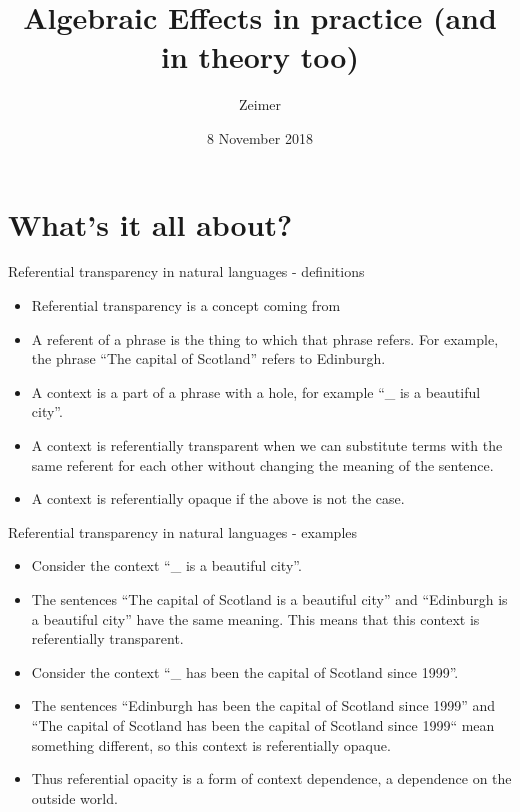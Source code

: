 \documentclass{beamer}
\title{Algebraic Effects in practice (and in theory too)}
\author{Zeimer}
\date{8 November 2018}
\newcommand{\link}[2]{\href{#2}{\color{blue}{#1}}}
\begin{document}
\frame{\titlepage}

\frame{\tableofcontents}

\section{What's it all about?}

\begin{frame}{Referential transparency in natural languages - definitions}
\begin{itemize}
	\item Referential transparency is a concept coming from \link{analytic philosophy}{https://en.wikipedia.org/wiki/Analytic_philosophy}
	\item A referent of a phrase is the thing to which that phrase refers. For example, the phrase ``The capital of Scotland'' refers to Edinburgh.
	\item A context is a part of a phrase with a hole, for example ``\_ is a beautiful city''.
	\item A context is referentially transparent when we can substitute terms with the same referent for each other without changing the meaning of the sentence.
	\item A context is referentially opaque if the above is not the case.
\end{itemize}
\end{frame}

\begin{frame}{Referential transparency in natural languages - examples}
\begin{itemize}
	\item Consider the context ``\_ is a beautiful city''.
	\item The sentences ``The capital of Scotland is a beautiful city'' and ``Edinburgh is a beautiful city'' have the same meaning. This means that this context is referentially transparent.
	\item Consider the context ``\_ has been the capital of Scotland since 1999''.
	\item The sentences ``Edinburgh has been the capital of Scotland since 1999'' and ``The capital of Scotland has been the capital of Scotland since 1999`` mean something different, so this context is referentially opaque.
	\item Thus referential opacity is a form of context dependence, a dependence on the outside world.
\end{itemize}
\end{frame}
\end{document}
